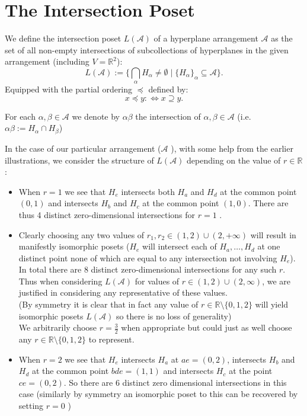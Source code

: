 \documentclass[12pt]{article}
\newcommand{\R}{\mathbb{R}}
\newenvironment{definition}[1][Definition]{\begin{trivlist}
\item[\hskip \labelsep {\bfseries #1}]}{\end{trivlist}}
\newenvironment{remark}[1][Remark]{\begin{trivlist}
\item[\hskip \labelsep {\bfseries #1}]}{\end{trivlist}}
\begin{document}
\section{The Intersection Poset}
\begin{definition}
	We define the intersection poset $L(\mathcal{A})$ of a hyperplane arrangement $\mathcal{A}$ as the set of all non-empty intersections of subcollections of hyperplanes in the given arrangement (including $V=\R^{2}$): \[
		L(\mathcal{A}) := \{\bigcap_{\alpha}H_{\alpha}\neq \emptyset \mid \{H_{\alpha}\}_{\alpha}\subseteq \mathcal{A} \} 
	.\]
Equipped with the partial ordering $\preceq$ defined by: \[
	x\preceq y :\iff x \supseteq y
	.\]
\end{definition}
\begin{remark}
	For each $\alpha,\beta\in \mathcal{A}$ we denote by $\alpha\beta$ the intersection of $\alpha,\beta\in \mathcal{A}$ (i.e. $\alpha\beta := H_{\alpha}\cap H_{\beta}$)
\end{remark}
In the case of our particular arrangement ($\mathcal{A}$ ), with some help from the earlier illustrations, we consider the structure of $L(\mathcal{A})$ depending on the value of $r\in \R$:
\begin{itemize}
	\item When $r=1$ we see that $H_e$ intersects both $H_a$ and $H_d$ at the common point $(0,1)$ and intersects $H_b$ and $H_c$ at the common point $(1,0)$. There are thus 4 distinct zero-dimensional intersections for $r=1$ .
	\item Clearly choosing any two values of $r_1,r_2\in (1,2)\cup (2,+\infty)$ will result in manifestly isomorphic posets ($H_e$ will intersect each of  $H_a,\ldots,H_d$ at one distinct point none of which are equal to any intersection not involving $H_e$). In total there are $8$ distinct zero-dimensional intersections for any such $r$. Thus when considering $L(\mathcal{A})$ for values of $r\in (1,2)\cup (2,\infty)$, we are justified in considering any representative of these values. \\
		(By symmetry it is clear that in fact any value of $r\in \R\setminus\{0,1,2\}$ will yield isomorphic posets  $L(\mathcal{A})$ so there is no loss of generality)\\
We arbitrarily choose $r=\frac{3}{2}$ when appropriate but could just as well choose any $r\in \R\setminus \{0,1,2\}$ to represent.
	\item When $r=2$ we see that $H_e$ intersects $H_a$ at $ae = (0,2)$, intersects  $H_b$ and $H_d$ at the common point $bde = (1,1)$ and intersects $H_c$ at the point $ce = (0,2)$. So there are $6$ distinct zero dimensional intersections in this case (similarly by symmetry an isomorphic poset to this can be recovered by setting $r=0$ )
\end{itemize}
\end{document}
